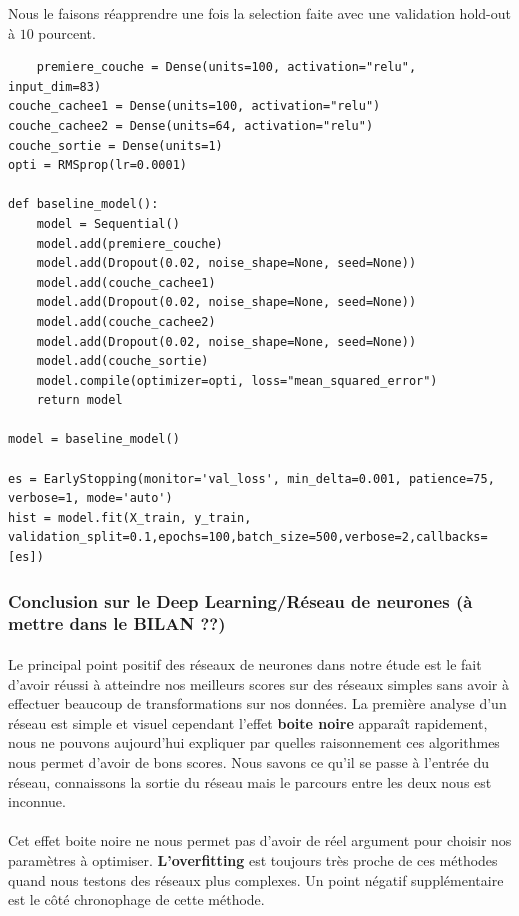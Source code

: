 \documentclass[14pt, openany]{article}
\begin{document}
Nous le faisons réapprendre une fois la selection faite avec une validation hold-out à $10$ pourcent.

\begin{verbatim}
    premiere_couche = Dense(units=100, activation="relu", input_dim=83)
couche_cachee1 = Dense(units=100, activation="relu")
couche_cachee2 = Dense(units=64, activation="relu")
couche_sortie = Dense(units=1)
opti = RMSprop(lr=0.0001)

def baseline_model():
    model = Sequential()
    model.add(premiere_couche)
    model.add(Dropout(0.02, noise_shape=None, seed=None))
    model.add(couche_cachee1)
    model.add(Dropout(0.02, noise_shape=None, seed=None))
    model.add(couche_cachee2)
    model.add(Dropout(0.02, noise_shape=None, seed=None))
    model.add(couche_sortie)
    model.compile(optimizer=opti, loss="mean_squared_error")
    return model

model = baseline_model()

es = EarlyStopping(monitor='val_loss', min_delta=0.001, patience=75, verbose=1, mode='auto')
hist = model.fit(X_train, y_train, validation_split=0.1,epochs=100,batch_size=500,verbose=2,callbacks=[es])
\end{verbatim}

\subsubsection{Conclusion sur le Deep Learning/Réseau de neurones (à mettre dans le BILAN ??)}
\paragraph{}
Le principal point positif des réseaux de neurones dans notre étude est le fait d'avoir réussi à atteindre nos meilleurs scores sur des réseaux simples sans avoir à effectuer beaucoup de transformations sur nos données. La première analyse d'un réseau est simple et visuel cependant l'effet \textbf{boite noire} apparaît rapidement, nous ne pouvons aujourd'hui expliquer par quelles raisonnement ces algorithmes nous permet d'avoir de bons scores. Nous savons ce qu'il se passe à l'entrée du réseau, connaissons la sortie du réseau mais le parcours entre les deux nous est inconnue.

\paragraph{}
Cet effet boite noire ne nous permet pas d'avoir de réel argument pour choisir nos paramètres à optimiser. \textbf{L'overfitting} est toujours très proche de ces méthodes quand nous testons des réseaux plus complexes. Un point négatif supplémentaire est le côté \og chronophage \fg{} de cette méthode.
\end{document}
